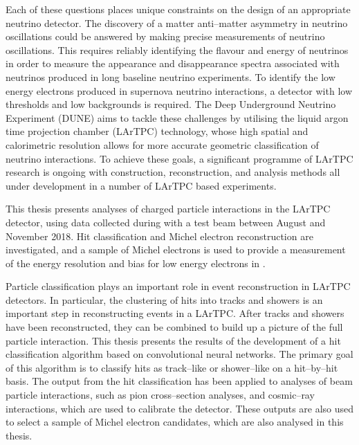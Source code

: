 Each of these questions places unique constraints on the design of an
appropriate neutrino detector. The discovery of a matter anti--matter asymmetry
in neutrino oscillations could be answered by making precise measurements of
neutrino oscillations. This requires reliably identifying the flavour and energy
of neutrinos in order to measure the appearance and disappearance spectra
associated with neutrinos produced in long baseline neutrino experiments. To
identify the low energy electrons produced in supernova neutrino interactions, a
detector with low thresholds and low backgrounds is required. The Deep
Underground Neutrino Experiment (DUNE) aims to tackle these challenges by
utilising the liquid argon time projection chamber (LArTPC) technology, whose
high spatial and calorimetric resolution allows for more accurate geometric
classification of neutrino interactions. To achieve these goals, a significant 
programme of LArTPC research is ongoing with construction, reconstruction, and 
analysis methods all under development in a number of LArTPC based 
experiments\cite{Acciarri:2016smi, Cavanna:2014iqa, Antonello:2015lea, 
Abi:2017aow}. 

This thesis presents analyses of charged particle interactions in the
\protodune{} LArTPC detector, using data collected during with a test beam 
between August and November 2018. Hit classification and Michel electron 
reconstruction are investigated, and a sample of Michel electrons is used to 
provide a measurement of the energy resolution and bias for low energy 
electrons in \protodune{}.

Particle classification plays an important role in event reconstruction in 
LArTPC detectors. In particular, the clustering of hits into tracks and 
showers is an important step in reconstructing events in a LArTPC. After tracks
and showers have been reconstructed, they can be combined to build up a picture
of the full particle interaction. This thesis presents the results of the 
development of a hit classification algorithm based on convolutional neural
networks. The primary goal of this algorithm is to classify hits as 
track--like or shower--like on a hit--by--hit basis. The output from the hit 
classification has been applied to analyses of beam particle interactions, 
such as pion cross--section analyses, and cosmic--ray interactions, which 
are used to calibrate the \protodune{} detector. These outputs are also used 
to select a sample of Michel electron candidates, which are also analysed in 
this thesis.

